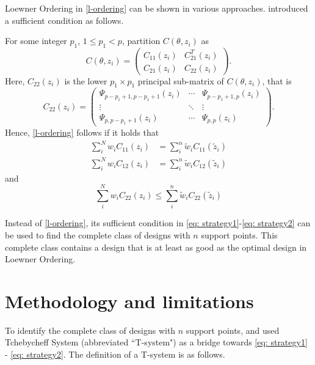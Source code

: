 \documentclass[12pt]{amsart}
\theoremstyle{definition}
\theoremstyle{remark}
\numberwithin{equation}{section}
\begin{document}
Loewner Ordering in \eqref{l-ordering} can be shown in various approaches. \cite{yang2012} introduced a sufficient condition as follows. 

For some integer $p_1$, $1\le p_1<p$, partition $C(\theta,z_i)$ as \begin{equation}\label{def_block}
    C(\theta,z_i) = \left(\begin{array}{cc}
      C_{11}(z_i)   &  C_{21}^T(z_i) \\
        C_{21}(z_i)  & C_{22}(z_i) 
    \end{array}\right).
\end{equation} Here, $C_{22}(z_i)$ is the lower $p_1\times p_1$ principal sub-matrix of $C(\theta,z_i)$, that is 
\begin{equation}\label{def_c22}
    C_{22}(z_i) = \left( \begin{array}{ccc}
      \Psi_{p-p_1+1, p-p_1+1}(z_i)   & \cdots & \Psi_{p-p_1+1, p}(z_i) \\
      \vdots & \ddots & \vdots\\
        \Psi_{p, p-p_1+1}(z_i)   &\cdots  & \Psi_{p, p}(z_i)  
    \end{array}\right).
\end{equation} Hence, \eqref{l-ordering} follows if it holds that 
\begin{align}\label{eq: strategy1}
    \sum_{i}^Nw_iC_{11}(z_i) &= \sum_{i}^n \tilde{w}_iC_{11}(\tilde{z}_i)\\
    \sum_{i}^Nw_iC_{12}(z_i) &= \sum_{i}^n \tilde{w}_iC_{12}(\tilde{z}_i)
\end{align} and 
\begin{equation}\label{eq: strategy2}
    \sum_{i}^Nw_iC_{22}(z_i) \le \sum_{i}^n \tilde{w}_iC_{22}(\tilde{z}_i)
\end{equation}


Instead of \eqref{l-ordering}, its sufficient condition in \eqref{eq: strategy1}-\eqref{eq: strategy2} can be used to find the complete class of designs with $n$ support points. This complete class contains a design that is at least as good as the optimal design in Loewner Ordering.


\section{Methodology and limitations} \label{metho}
To identify the complete class of designs with $n$ support points, \cite{yang2012} and \cite{dette2011} used Tchebycheff System (abbreviated ``T-system") as a bridge towards \eqref{eq: strategy1} - \eqref{eq: strategy2}. The definition of a T-system is as follows.
\end{document}
